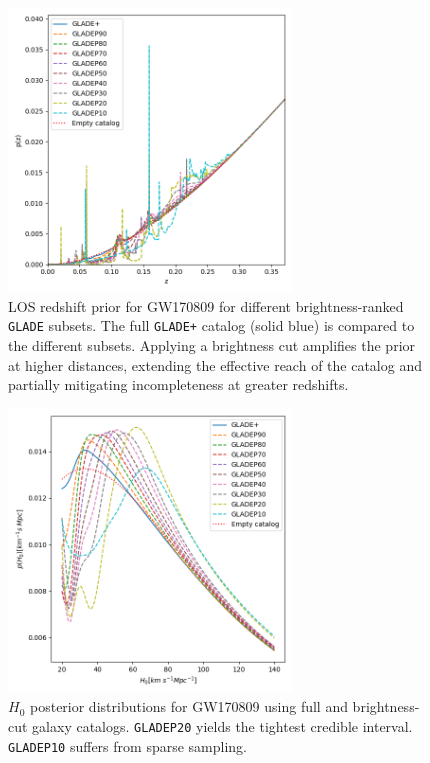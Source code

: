 \begin{figure}[ht]
  \centering
  \includegraphics[width=0.67\textwidth]{figures/GW170809_zprior.png}
  \caption[LOS redshift prior for GW170809 for different brightness-ranked \texttt{GLADE} subsets]{LOS redshift prior for GW170809 for different brightness-ranked \texttt{GLADE} subsets. The full \texttt{GLADE+} catalog (solid blue) is compared to the different subsets. Applying a brightness cut amplifies the prior at higher distances, extending the effective reach of the catalog and partially mitigating incompleteness at greater redshifts.}
  \label{fig:los_prior_gw170809}
\end{figure}

\begin{figure}[h!]
  \centering
  \includegraphics[width=0.67\textwidth]{figures/GW170809_H0.png}
  \caption[$H_0$ posterior distributions for GW170809 using full and brightness-cut galaxy catalogs.]{$H_0$ posterior distributions for GW170809 using full and brightness-cut galaxy catalogs. \texttt{GLADEP20} yields the tightest credible interval. \texttt{GLADEP10} suffers from sparse sampling.}
  \label{fig:h0_gw170809}
\end{figure}

